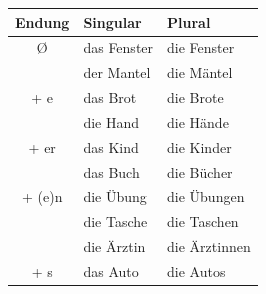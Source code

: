 \documentclass[a4paper]{article}
\title{}
\date{}
\begin{document}
    \maketitle
    \begin{tabular}{|c|l|l|}
        \hline
        \textbf{Endung} & \textbf{Singular} & \textbf{Plural} \\
        \hline
        
        Ø               & das Fenster       & die Fenster     \\
        & der Mantel        & die Mäntel      \\
        
        \hline
        + e             & das Brot          & die Brote       \\
        & die Hand          & die Hände       \\
        
        \hline
        + er            & das Kind          & die Kinder      \\
        & das Buch          & die Bücher      \\
        
        \hline
        + (e)n          & die Übung         & die Übungen     \\
        & die Tasche        & die Taschen     \\
        & die Ärztin        & die Ärztinnen   \\
        
        \hline
        + s             & das Auto          & die Autos       \\
        
        \hline
    \end{tabular}
\end{document}
